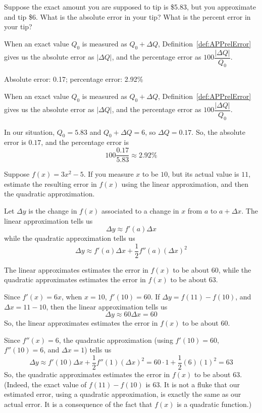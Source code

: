\begin{question}
Suppose the exact amount you are supposed to tip is \$5.83, but you approximate and tip \$6. What is the absolute error in your tip? What is the percent error in your tip?
\end{question}
\begin{hint}
When an exact value $Q_0$ is measured as $Q_0+\Delta Q$,
Definition~\ref*{def:APPrelError}
gives us the absolute error as $|\Delta Q|$, and the percentage error as $100\dfrac{|\Delta Q|}{Q_0}$.
\end{hint}
\begin{answer}
Absolute error: 0.17; percentage error: 2.92\%
\end{answer}
\begin{solution}
When an exact value $Q_0$ is measured as $Q_0+\Delta Q$,
Definition~\ref*{def:APPrelError}
gives us the absolute error as $|\Delta Q|$, and the percentage error as $100\dfrac{|\Delta Q|}{Q_0}$.

In our situation, $Q_0=5.83$ and $Q_0+\Delta Q = 6$, so $\Delta Q = 0.17$. So, the absolute error is $0.17$, and the percentage error is
\[100\frac{0.17}{5.83}\approx 2.92 \%\]
\end{solution}


\begin{question}
Suppose $f(x)=3x^2-5$. If you measure $x$ to be $10$, but its actual value is $11$, estimate the resulting error in $f(x)$ using the linear approximation, and then the quadratic approximation.
\end{question}
\begin{hint}
Let $\Delta y$ is the change in $f(x)$ associated to a change in $x$ from $a$ to $a+\Delta x$. The linear approximation tells us
\[\Delta y \approx f'(a)\Delta x\]
while the quadratic approximation tells us
\[\Delta y \approx f'(a)\Delta x+\frac{1}{2}f''(a)\left(\Delta x\right)^2\]
\end{hint}
\begin{answer}
The linear approximates estimates the error in $f(x)$ to be about 60, while
the quadratic approximates estimates the error in $f(x)$ to be about 63.
\end{answer}
\begin{solution}
Since $f'(x)=6x$, when $x=10$, $f'(10)=60$. If $\Delta y=f(11)-f(10)$, and $\Delta x = 11-10$, then the linear approximation tells us
\[\Delta y \approx 60\Delta x = 60\]
So, the linear approximates estimates the error in $f(x)$ to be about 60.

Since $f''(x)=6$, the quadratic approximation
(using $f'(10)=60$, $f''(10)=6$, and $\Delta x = 1$) tells us
\[\Delta y \approx f'(10)\Delta x+\frac{1}{2}f''(1)\left(\Delta x\right)^2= 60\cdot 1 +\frac{1}{2}(6)(1)^2=
63\]
So, the quadratic approximates estimates the error in $f(x)$ to be about 63. (Indeed, the exact value of $f(11)-f(10)$ is 63. It is not   a fluke that our estimated error, using a quadratic approximation, is exactly the same as our actual error. It is a consequence of the fact that $f(x)$ is a quadratic
         function.)
\end{solution}




